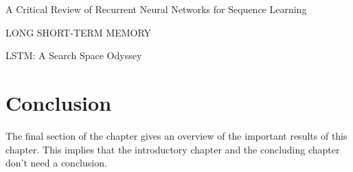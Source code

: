 A Critical Review of Recurrent Neural Networks
for Sequence Learning


LONG SHORT-TERM MEMORY

LSTM: A Search Space Odyssey

\section{Conclusion}
The final section of the chapter gives an overview of the important results
of this chapter. This implies that the introductory chapter and the
concluding chapter don't need a conclusion.



